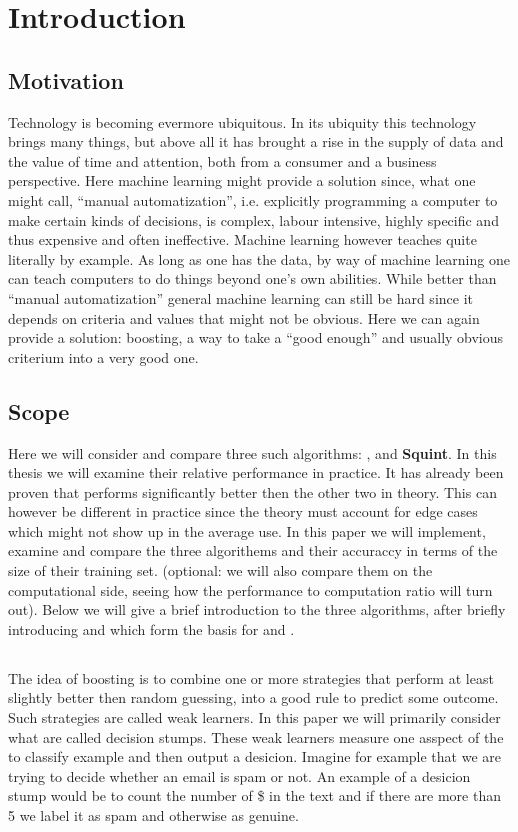 
\chapter{Introduction}
\label{chap:intro}
\section{Motivation}
\label{sec:motiv}

Technology is becoming evermore ubiquitous. In its ubiquity this technology brings many things, but above all it has brought a rise in the supply of data and the value of time and attention, both from a consumer and a business perspective. Here machine learning might provide a solution since, what one might call, ``manual automatization'', i.e. explicitly programming a computer to make certain kinds of decisions, is complex, labour intensive, highly specific and thus expensive and often ineffective. Machine learning however teaches quite literally by example. As long as one has the data, by way of machine learning one can teach computers to do things beyond one's own abilities. While better than ``manual automatization'' general machine learning can still be hard since it depends on criteria and values that might not be obvious. Here we can again provide a solution: boosting, a way to take a ``good enough'' and usually obvious criterium into a very good one.

\section{Scope} Here we will consider and compare three such algorithms: \adaB, \adaN and \textbf{Squint}. In this thesis we will examine their relative performance in practice. It has already been proven that \squint performs significantly better then the other two in theory. This can however be different in practice since the theory must account for edge cases which might not show up in the average use. In this paper we will implement, examine and compare the three algorithems and their accuraccy in terms of the size of their training set. (optional: we will also compare them on the computational side, seeing how the performance to computation ratio will turn out). Below we will give a brief introduction to the three algorithms, after briefly introducing \hedge and \weak which form the basis for \adaB and \adaN.

\section{\weak}
The idea of boosting is to combine one or more strategies that perform at least slightly better then random guessing, into a good rule to predict some outcome. Such strategies are called weak learners. In this paper we will primarily consider what are called decision stumps. These weak learners measure one asspect of the to classify example and then output a desicion. Imagine for example that we are trying to decide whether an email is spam or not. An example of a desicion stump would be to count the number of \$ in the text and if there are more than 5 we label it as spam and otherwise as genuine. 

